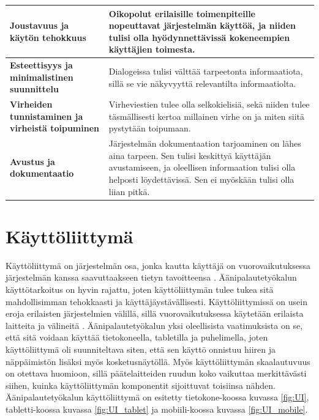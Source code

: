 \documentclass[utf8]{gradu3}
\begin{document}
\begin{table}[H]
\begin{tabular}{|p{12.355em}|p{21.855em}|}
    \textbf{\textbf{Joustavuus ja käytön tehokkuus}} & Oikopolut erilaisille toimenpiteille nopeuttavat  järjestelmän käyttöä, ja niiden tulisi olla hyödynnettävissä kokeneempien käyttäjien toimesta.  \\
    \hline
    
    \textbf{Esteettisyys ja minimalistinen suunnittelu} & Dialogeissa tulisi välttää tarpeetonta informaatiota, sillä se vie näkyvyyttä relevantilta informaatiolta. \\
    \hline
    
    \textbf{Virheiden tunnistaminen ja virheistä toipuminen} & Virheviestien tulee olla selkokielisiä, sekä niiden tulee täsmällisesti kertoa millainen virhe on ja miten siitä pystytään toipumaan. \\
    \hline
    
    \textbf{Avustus ja dokumentaatio} & Järjestelmän dokumentaation tarjoaminen on lähes aina tarpeen. Sen tulisi keskittyä käyttäjän avustamiseen, ja oleellisen informaation tulisi olla helposti löydettävissä. Sen ei myöskään tulisi olla liian pitkä. \\
    \hline
    \end{tabular}%
  \label{nielsen}%
\end{table}%

\restoregeometry

\section{Käyttöliittymä}
\label{Kayttoliittyma}

Käyttöliittymä on järjestelmän osa, jonka kautta käyttäjä on vuorovaikutuksessa järjestelmän kanssa saavuttaakseen tietyn tavoitteensa \parencite{stone}. Äänipalautetyökalun käyttötarkoitus on hyvin rajattu, joten käyttöliittymän tulee tukea sitä mahdollisimman tehokkaasti ja käyttäjäystävällisesti. Käyttöliittymissä on usein eroja erilaisten järjestelmien välillä, sillä vuorovaikutuksessa käytetään erilaista laitteita ja välineitä \parencite{stone}. Äänipalautetyökalun yksi oleellisista vaatimuksista on se, että sitä voidaan käyttää tietokoneella, tabletilla ja puhelimella, joten käyttöliittymä oli suunniteltava siten, että sen käyttö onnistuu hiiren ja näppäimistön lisäksi myös kosketusnäytöllä. Myös käyttöliittymän skaalautuvuus on otettava huomioon, sillä päätelaitteiden ruudun koko vaikuttaa merkittävästi siihen, kuinka käyttöliittymän komponentit sijoittuvat toisiinsa nähden. Äänipalautetyökalun käyttöliittymä on esitetty tietokone-koossa kuvassa \ref{fig:UI}, tabletti-koossa kuvassa \ref{fig:UI_tablet} ja mobiili-koossa kuvassa \ref{fig:UI_mobile}.
\end{document}
